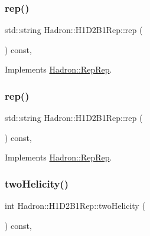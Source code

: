 \subsubsection{\texorpdfstring{rep()}{rep()}\hspace{0.1cm}{\footnotesize\ttfamily [2/3]}}
{\footnotesize\ttfamily std\+::string Hadron\+::\+H1\+D2\+B1\+Rep\+::rep (\begin{DoxyParamCaption}{ }\end{DoxyParamCaption}) const\hspace{0.3cm}{\ttfamily [inline]}, {\ttfamily [virtual]}}



Implements \mbox{\hyperlink{structHadron_1_1RepRep_ab3213025f6de249f7095892109575fde}{Hadron\+::\+Rep\+Rep}}.

\mbox{\label{structHadron_1_1H1D2B1Rep_a4728e19334216fe0a85733f3356d8716}} 
\subsubsection{\texorpdfstring{rep()}{rep()}\hspace{0.1cm}{\footnotesize\ttfamily [3/3]}}
{\footnotesize\ttfamily std\+::string Hadron\+::\+H1\+D2\+B1\+Rep\+::rep (\begin{DoxyParamCaption}{ }\end{DoxyParamCaption}) const\hspace{0.3cm}{\ttfamily [inline]}, {\ttfamily [virtual]}}



Implements \mbox{\hyperlink{structHadron_1_1RepRep_ab3213025f6de249f7095892109575fde}{Hadron\+::\+Rep\+Rep}}.

\mbox{\label{structHadron_1_1H1D2B1Rep_a3cc2db9e517e6a40e7205a5dbc9b32c9}} 
\subsubsection{\texorpdfstring{twoHelicity()}{twoHelicity()}\hspace{0.1cm}{\footnotesize\ttfamily [1/2]}}
{\footnotesize\ttfamily int Hadron\+::\+H1\+D2\+B1\+Rep\+::two\+Helicity (\begin{DoxyParamCaption}{ }\end{DoxyParamCaption}) const\hspace{0.3cm}{\ttfamily [inline]}, {\ttfamily [virtual]}}

